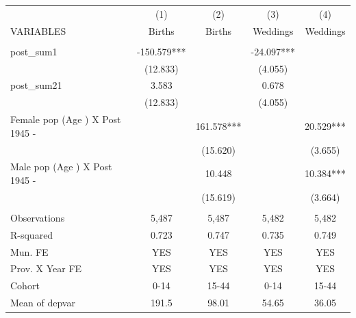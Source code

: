 \begin{tabular}{lcccc} \hline
 & (1) & (2) & (3) & (4) \\
VARIABLES & Births & Births & Weddings & Weddings \\ \hline
 &  &  &  &  \\
post\_sum1 & -150.579*** &  & -24.097*** &  \\
 & (12.833) &  & (4.055) &  \\
post\_sum21 & 3.583 &  & 0.678 &  \\
 & (12.833) &  & (4.055) &  \\
Female pop (Age ) X Post 1945 - &  & 161.578*** &  & 20.529*** \\
 &  & (15.620) &  & (3.655) \\
Male pop (Age ) X Post 1945 - &  & 10.448 &  & 10.384*** \\
 &  & (15.619) &  & (3.664) \\
 &  &  &  &  \\
Observations & 5,487 & 5,487 & 5,482 & 5,482 \\
R-squared & 0.723 & 0.747 & 0.735 & 0.749 \\
Mun. FE & YES & YES & YES & YES \\
Prov. X Year FE & YES & YES & YES & YES \\
Cohort & 0-14 & 15-44 & 0-14 & 15-44 \\
 Mean of depvar & 191.5 & 98.01 & 54.65 & 36.05 \\ \hline
\end{tabular}
